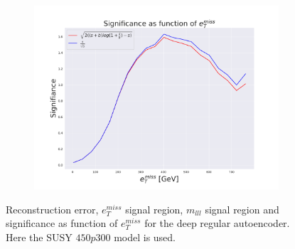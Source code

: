 \begin{figure}[H]
    \hfill 
    \begin{subfigure}{.60\textwidth}
        \includegraphics[width=\textwidth]{Figures/VAE_testing/big/2lep/significance_etmiss_450p0p0300_-0.8121874101107931.pdf}
        \caption{}
        \label{fig:VAE_2lep_big_signi_450}
    \end{subfigure}
    \hfill      
    \caption[2lep deep network | $450p300$ | VAE]{Reconstruction error, $e_T^{miss}$ signal region, $m_{lll}$ signal region and significance as function of 
    $e_T^{miss}$ for the deep regular autoencoder. Here the SUSY $450p300$ model is used.}
    \label{fig:VAE_2lep_big_rec_sig_signi_450}
\end{figure}

